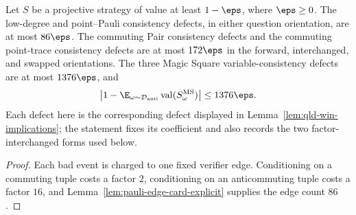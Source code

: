 \begin{theorem}
\label{thm:qld-win-implications-explicit}
\leanok
{}
Let $S$ be a projective strategy of value at least $1-\eps$, where
$\eps\geq0$.  The low-degree and point--Pauli consistency defects, in either
question orientation, are at most $86\eps$.  The commuting Pair consistency
defects and the commuting point-trace consistency defects are at most
$172\eps$ in the forward, interchanged, and swapped orientations.  The three
Magic Square variable-consistency defects are at most $1376\eps$, and
\[
 \left|1-\E_{\omega\sim\mathcal D_{\mathrm{anti}}}
   \operatorname{val}(S_{\omega}^{\mathrm{MS}})\right|
 \leq1376\eps.
\]
Each defect here is the corresponding defect displayed in
Lemma~\ref{lem:qld-win-implications}; the statement fixes its coefficient and
also records the two factor-interchanged forms used below.
\end{theorem}
\begin{proof}
\leanok
Each bad event is charged to one fixed verifier edge.  Conditioning on a
commuting tuple costs a factor $2$, conditioning on an anticommuting tuple
costs a factor $16$, and Lemma~\ref{lem:pauli-edge-card-explicit} supplies the
edge count $86$.
\end{proof}

